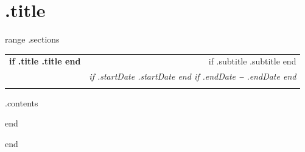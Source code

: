 \documentclass[letterpaper,11pt]{article}
\makeatletter
\newcommand{\resumeSubheading}[4]{
  \vspace{-2pt}\item
    \begin{tabular*}{0.97\textwidth}[t]{l@{\extracolsep{\fill}}r}
      \textbf{#1} & #2 \\
      \textit{\small#3} & \textit{\small #4} \\
    \end{tabular*}\vspace{-7pt}
}
\newcommand{\resumeEducationHeading}[6]{
  \vspace{-2pt}\item
    \begin{tabular*}{0.97\textwidth}[t]{l@{\extracolsep{\fill}}r}
      \textbf{#1} & #2 \\
      \textit{\small#3} & \textit{\small #4} \\
      \textit{\small#5} & \textit{\small #6} \\
    \end{tabular*}\vspace{-5pt}
}
\newcommand{\resumeSubHeadingListStart}{\begin{itemize}[leftmargin=0.15in, label={}]}
\newcommand{\resumeSubHeadingListEnd}{\end{itemize}}
\makeatother
\begin{document}
\section{ {{ .title }} }
  \vspace{3pt}
  \resumeSubHeadingListStart
  {{ range .sections }}
    \resumeEducationHeading
      { {{ if .title }}{{ .title }}{{ end }} 
      }{ {{ if .subtitle }} {{ .subtitle }} {{ end }} }
      {
        }{ {{ if .startDate }}{{ .startDate }}{{ end }}  {{ if .endDate }} \textbf{--} {{ .endDate }}{{ end }} }
      {
      }{
        }
        \resumeSubHeadingListStart
        \small{\item{
          {{ .contents }}
            }
            }
        \resumeSubHeadingListEnd
    
    {{ end }}
  \resumeSubHeadingListEnd

{{ end }}
\end{document}

